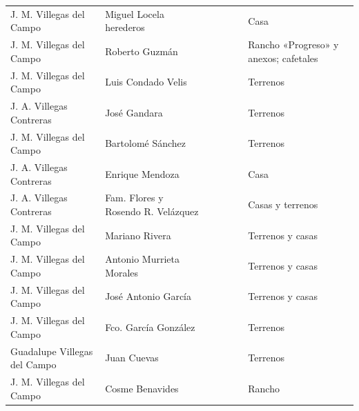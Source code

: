 \documentclass[14pt,twoside,final]{extbook} %
\begin{document}
{\begin{longtable}[c]{@{}p{2.5cm}lrSrrl@{}}
J. M. Villegas del Campo & Miguel Locela herederos &  &  &  &  & Casa \\
J. M. Villegas del Campo & Roberto Guzmán &  &  &  &  & Rancho «Progreso» y anexos; cafetales \\
J. M. Villegas del Campo & Luis Condado Velis &  & {} & {} & {} & Terrenos \\
J. A. Villegas Contreras & José Gandara &  &  &  &  & Terrenos \\
J. M. Villegas del Campo & Bartolomé Sánchez &  & {} &  &  & Terrenos \\
J. A. Villegas Contreras & Enrique Mendoza &  &  &  &  & Casa \\
J. A. Villegas Contreras & Fam. Flores y Rosendo R. Velázquez &  &  &  &  & Casas y terrenos \\
J. M. Villegas del Campo & Mariano Rivera &  &  &  &  & Terrenos y casas \\
J. M. Villegas del Campo & Antonio Murrieta Morales &  &  &  &  & Terrenos y casas \\
J. M. Villegas del Campo & José Antonio García &  &  &  &  & Terrenos y casas \\
J. M. Villegas del Campo & Fco. García González &  &  &  &  & Terrenos \\
Guadalupe Villegas del Campo & Juan Cuevas &  &  & {} & {} & Terrenos \\
J. M. Villegas del Campo & Cosme Benavides &  &  &  &  & Rancho \\

\end{longtable}}
\end{document}
